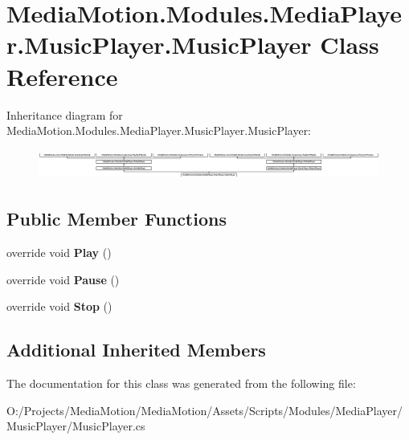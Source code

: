\hypertarget{class_media_motion_1_1_modules_1_1_media_player_1_1_music_player_1_1_music_player}{\section{Media\+Motion.\+Modules.\+Media\+Player.\+Music\+Player.\+Music\+Player Class Reference}
\label{class_media_motion_1_1_modules_1_1_media_player_1_1_music_player_1_1_music_player}
}
Inheritance diagram for Media\+Motion.\+Modules.\+Media\+Player.\+Music\+Player.\+Music\+Player\+:\begin{figure}[H]
\begin{center}
\leavevmode
\includegraphics[height=0.998218cm]{class_media_motion_1_1_modules_1_1_media_player_1_1_music_player_1_1_music_player}
\end{center}
\end{figure}
\subsection*{Public Member Functions}
\begin{DoxyCompactItemize}
\item 
\hypertarget{class_media_motion_1_1_modules_1_1_media_player_1_1_music_player_1_1_music_player_ad3c6d8dca403d823575e1ad6135657ff}{override void {\bfseries Play} ()}\label{class_media_motion_1_1_modules_1_1_media_player_1_1_music_player_1_1_music_player_ad3c6d8dca403d823575e1ad6135657ff}

\item 
\hypertarget{class_media_motion_1_1_modules_1_1_media_player_1_1_music_player_1_1_music_player_ab4ac12829d097ea3972af1eebe67e571}{override void {\bfseries Pause} ()}\label{class_media_motion_1_1_modules_1_1_media_player_1_1_music_player_1_1_music_player_ab4ac12829d097ea3972af1eebe67e571}

\item 
\hypertarget{class_media_motion_1_1_modules_1_1_media_player_1_1_music_player_1_1_music_player_adb718d8b3ec481202486595f7d1f661c}{override void {\bfseries Stop} ()}\label{class_media_motion_1_1_modules_1_1_media_player_1_1_music_player_1_1_music_player_adb718d8b3ec481202486595f7d1f661c}

\end{DoxyCompactItemize}
\subsection*{Additional Inherited Members}


The documentation for this class was generated from the following file\+:\begin{DoxyCompactItemize}
\item 
O\+:/\+Projects/\+Media\+Motion/\+Media\+Motion/\+Assets/\+Scripts/\+Modules/\+Media\+Player/\+Music\+Player/Music\+Player.\+cs\end{DoxyCompactItemize}
